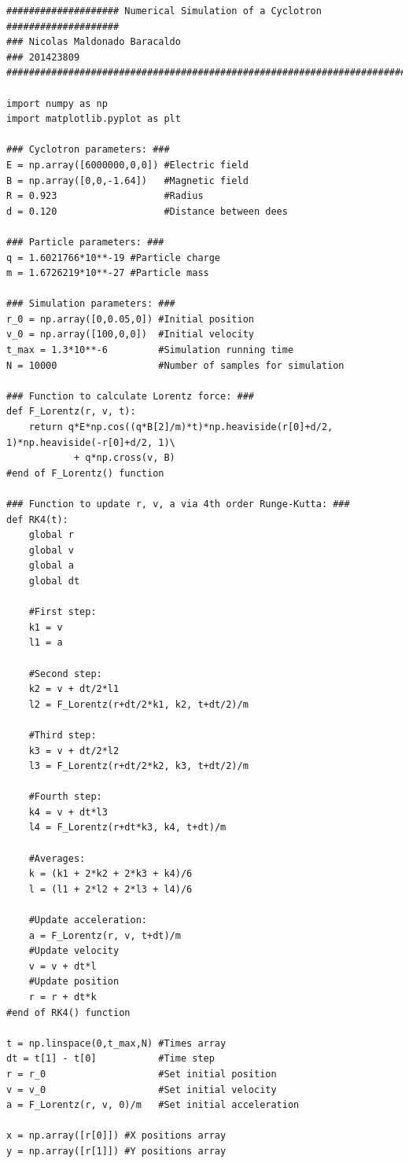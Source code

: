 \documentclass[letterpaper, 11pt]{article}
\begin{document}
\begin{lstlisting}
#################### Numerical Simulation of a Cyclotron ####################
### Nicolas Maldonado Baracaldo
### 201423809
#############################################################################

import numpy as np
import matplotlib.pyplot as plt

### Cyclotron parameters: ###
E = np.array([6000000,0,0]) #Electric field
B = np.array([0,0,-1.64])   #Magnetic field
R = 0.923                   #Radius
d = 0.120                   #Distance between dees

### Particle parameters: ###
q = 1.6021766*10**-19 #Particle charge
m = 1.6726219*10**-27 #Particle mass

### Simulation parameters: ###
r_0 = np.array([0,0.05,0]) #Initial position
v_0 = np.array([100,0,0])  #Initial velocity
t_max = 1.3*10**-6         #Simulation running time
N = 10000                  #Number of samples for simulation

### Function to calculate Lorentz force: ###
def F_Lorentz(r, v, t):
    return q*E*np.cos((q*B[2]/m)*t)*np.heaviside(r[0]+d/2, 1)*np.heaviside(-r[0]+d/2, 1)\
            + q*np.cross(v, B)
#end of F_Lorentz() function

### Function to update r, v, a via 4th order Runge-Kutta: ###
def RK4(t):
    global r
    global v
    global a
    global dt
    
    #First step:
    k1 = v
    l1 = a
    
    #Second step:
    k2 = v + dt/2*l1
    l2 = F_Lorentz(r+dt/2*k1, k2, t+dt/2)/m
    
    #Third step:
    k3 = v + dt/2*l2
    l3 = F_Lorentz(r+dt/2*k2, k3, t+dt/2)/m
    
    #Fourth step:
    k4 = v + dt*l3
    l4 = F_Lorentz(r+dt*k3, k4, t+dt)/m
    
    #Averages:
    k = (k1 + 2*k2 + 2*k3 + k4)/6
    l = (l1 + 2*l2 + 2*l3 + l4)/6

    #Update acceleration:
    a = F_Lorentz(r, v, t+dt)/m
    #Update velocity
    v = v + dt*l
    #Update position
    r = r + dt*k
#end of RK4() function

t = np.linspace(0,t_max,N) #Times array
dt = t[1] - t[0]           #Time step
r = r_0                    #Set initial position
v = v_0                    #Set initial velocity
a = F_Lorentz(r, v, 0)/m   #Set initial acceleration

x = np.array([r[0]]) #X positions array
y = np.array([r[1]]) #Y positions array


\end{lstlisting}
\end{document}
